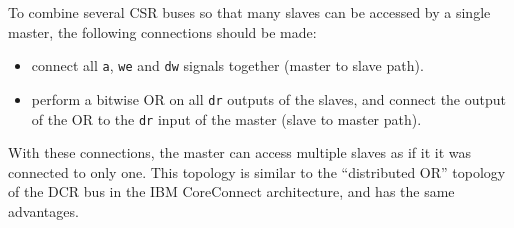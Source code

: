 \documentclass[a4paper,11pt]{article}
\begin{document}
To combine several CSR buses so that many slaves can be accessed by a single master, the following connections should be made:
\begin{itemize}
\item connect all \verb!a!, \verb!we! and \verb!dw! signals together (master to slave path).
\item perform a bitwise OR on all \verb!dr! outputs of the slaves, and connect the output of the OR to the \verb!dr! input of the master (slave to master path).
\end{itemize}
With these connections, the master can access multiple slaves as if it it was connected to only one.
This topology is similar to the ``distributed OR'' topology of the DCR bus in the IBM CoreConnect architecture, and has the same advantages.
\end{document}
